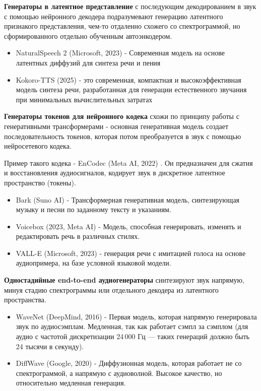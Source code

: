 \textbf{Генераторы в латентное представление} с последующим декодированием в звук с помощью нейронного декодера подразумевают 
генерацию латентного признакого представления, чем-то отдаленно схожего со спектрограммой, но сформированного отдельно обученным автоэнкодером.

\begin{itemize} 
  \item NaturalSpeech 2 (Microsoft, 2023) \cite{NaturalSpeech2} - Современная модель на основе латентных диффузий для синтеза речи и пения
  \item Kokoro-TTS (2025) \cite{kokoro}- это современная, компактная и высокоэффективная модель синтеза речи, разработанная для генерации естественного звучания при минимальных вычислительных затратах
\end{itemize}

\textbf{Генераторы токенов для нейронного кодека} схожи по принципу работы с генеративными трансформерами - основная генеративная модель создает последовательность токенов, 
которая потом преобразуется в звук с помощью нейросетевого кодека.

Пример такого кодека - EnCodec (Meta AI, 2022) \cite{encodec}. Он предназначен для сжатия и восстановления аудиосигналов, кодирует звук в дискретное латентное пространство (токены).

\begin{itemize} 
  \item Bark (Suno AI) \cite{SunoAI_Bark_2023} - Трансформерная генеративная модель, синтезирующая музыку и песни по заданному тексту и указаниям.
  \item Voicebox (2023, Meta AI) \cite{le2023voicebox} - Модель, способная генерировать, изменять и редактировать речь в различных стилях.
  \item VALL-E (Microsoft, 2023) \cite{Valle} - генерация речи с имитацией голоса на основе аудиопримера, на базе условной языковой модели.
\end{itemize}

\textbf{Одностадийные end-to-end аудиогенераторы} синтезируют звук напрямую, минуя стадию спектрограммы или отдельного декодера из латентного пространства.

\begin{itemize} 
  \item WaveNet (DeepMind, 2016) \cite{WaveNet} - Первая модель, которая напрямую генерировала звук по аудиосэмплам. Медленная, так как работает сэмпл за сэмплом (для аудио с частотой дискретизации 24 000 Гц — таких генераций должно быть 24 тысячи в секунду).
  \item DiffWave (Google, 2020) \cite{DiffWave} - Диффузионная модель, которая работает не со спектрограммой, а напрямую с аудиоволной. Высокое качество, но относительно медленная генерация.
\end{itemize}



